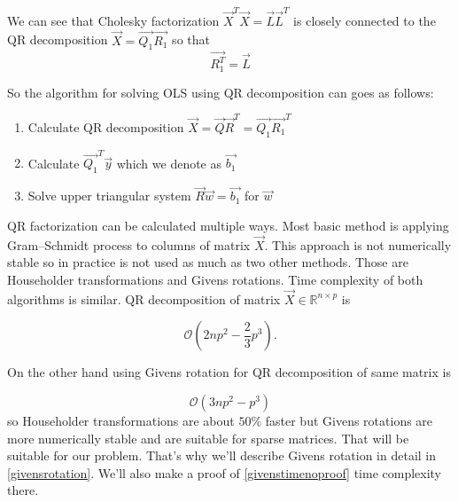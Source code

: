 \begin{note}
		We can see that Cholesky factorization  $\vec{X}^T\vec{X} = \vec{L}\vec{L}^T$ is closely connected to the QR decomposition $\vec{X} = \vec{Q_1}\vec{R_1}$ so that  
		\begin{equation} \label{qrcholesky}
				\vec{R_1^T} = \vec{L}
			\end{equation}
\end{note}


So the algorithm for solving OLS using QR decomposition can goes as follows:
\begin{enumerate}
  \item Calculate QR decomposition $\vec{X} = \vec{Q}\vec{R}^T = \vec{Q_1}\vec{R_1}^T$ 
  \item Calculate $\vec{Q_1}^T \vec{y}$ which we denote as $\vec{b_1}$ 
  \item Solve upper triangular system $	\vec{R}\vec{w} = \vec{b_1}$ for $\vec{w}$
\end{enumerate}

QR factorization can be calculated multiple ways. Most basic method is applying Gram–Schmidt process
to columns of matrix $\vec{X}$. This approach is not numerically stable so in practice is not used as much as two other methods. Those are Householder transformations and Givens rotations.
Time complexity of both algorithms is similar. QR decomposition of matrix $\vec{X} \in \mathbb{R}^{n \times p}$ is 

\begin{equation}
	\mathcal{O}(2np^2 - \frac{2}{3}p^3).
\end{equation}

On the other hand using Givens rotation for QR decomposition of same matrix is 

\begin{equation} \label{givenstimenoproof}
	\mathcal{O}(3np^2 - p^3)
\end{equation}
so Householder transformations  are about $50\%$ faster but Givens rotations are more numerically stable and are suitable for sparse matrices. That will be suitable for our problem. That's why we'll describe Givens rotation in detail in \ref{givensrotation}. We'll also make a proof of \ref{givenstimenoproof} time complexity there.

